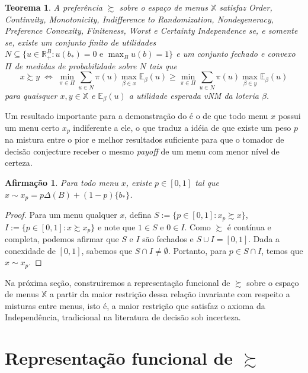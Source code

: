 \documentclass[11pt, a4paper]{article}
\theoremstyle{nonumberplain}
\newtheorem{proof}{Dem.}
\theoremstyle{plain}
\newtheorem{theorem}{Teorema}
\theoremstyle{plain}
\newtheorem{claim}{Afirmação}
\theoremstyle{plain}
\begin{document}
\begin{theorem} \label{nossoteorema} A preferência $\succsim$ sobre o espaço de menus $\mathbb{X}$ satisfaz \emph{Order}, \emph{Continuity}, \emph{Monotonicity}, \emph{Indifference to Randomization}, \emph{Nondegeneracy}, \emph{Preference Convexity}, \emph{Finiteness}, \emph{Worst} e \emph{Certainty Independence} se, e somente se, existe um conjunto finito de utilidades $N\subseteq \{u \in \mathbb{R}^B_+:u(b_*)=0\text { e }\max_{B}u(b)=1\}$ e um conjunto fechado e convexo $\Pi$ de medidas de probabilidade sobre $N$ tais que 
\[x \succsim y \;\Leftrightarrow\; \min_{\pi\in\Pi}\sum_{u\in N} \pi(u)\max_{\beta\in x}\mathbb{E}_\beta(u)\geq \min_{\pi\in\Pi}\sum_{u\in N} \pi(u)\max_{\beta\in y}\mathbb{E}_\beta(u)\]
para quaisquer $x,y\in\mathbb{X}$ e $\mathbb{E}_\beta(u)$ a utilidade esperada vNM
da loteria $\beta$. \end{theorem} 

Um resultado importante para a demonstração do  é o de que todo menu $x$ possui um menu certo $x_p$ indiferente a ele, o que traduz a idéia de que existe um peso $p$ na mistura entre o pior e melhor resultados suficiente para que o tomador de decisão conjecture receber o mesmo \emph{payoff} de um menu com menor nível de certeza. 

\begin{claim}Para todo menu $x$, existe $p\in[0,1]$ tal que $x\sim x_p=p\Delta(B)+(1-p)\{b_*\}$. \end{claim}
\begin{proof}
Para um menu qualquer $x$, defina $S:=\{p\in[0,1] : x_p\succsim x\}$, $I:=\{p\in[0,1] : x\succsim x_p\}$ e note que $1\in S$ e $0\in I$. Como $\succsim$ é contínua e completa, podemos afirmar que $S$ e $I$ são fechados e $S\cup I=[0,1]$. Dada a conexidade de $[0,1]$, sabemos que $S\cap I\neq \emptyset$. Portanto, para $p\in S\cap I$, temos que $x\sim x_p$.   
\end{proof}

Na próxima seção, construiremos a representação funcional de $\succsim$ sobre o espaço de menus $\mathbb{X}$ a partir da maior restrição dessa relação invariante com respeito a misturas entre menus, isto é, a maior restrição que satisfaz o axioma da Independência, tradicional na literatura de decisão sob incerteza. 

\section{Representação funcional de $\succsim$}
\end{document}
